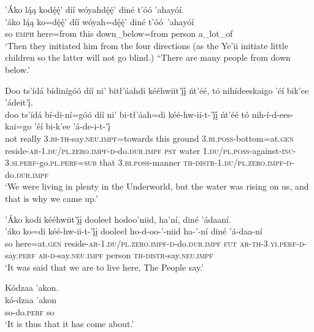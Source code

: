 \ea\label{ex:text4-4-14}
’Áko lą́ą kodę́ę́’ díí wóyahdę́ę́’ diné t’óó ’ahayóí.\\
\gll ’áko	lą́ą	ko=dę́ę́’	díí	wóyah=dę́ę́’	diné	t’óó~{’ahayóí}\\
     so	\textsc{emph}	here=from	this	down\_below=from	person	a\_lot\_of\\
\glt `Then they initiated him from the four directions (as the Ye'ii initiate little children so the latter will not go blind.) ``There are many people from down below.'
\z

\ea\label{ex:text4-4-15}
Doo ts’ídá bídinígóó díí ni’ bitł’áahdi kééhwiit’į́į́ ńt’éé, tó nihídeeskaigo ’éí bik’ee ’ádeit’į́.\\
\gll doo	ts’ídá	bí-di-ní=góó	díí	ni’	bi-tł’áah=di	kéé-hw-ii-t-’į́į́	ńt’éé	tó	nih-í-d-ees-kai=go	’éí	bi-k’ee	’á-de-i-t-’į́\\
     not	really	3.\textsc{bi}-\textsc{th}-say.\textsc{neu}.\textsc{impf}=towards	this	ground	3.\textsc{bi}.\textsc{poss}-bottom=at.\textsc{gen}	reside-\textsc{ar}-1.\textsc{du}/\textsc{pl}.\textsc{zero}.\textsc{impf}-\textsc{d}-do.\textsc{dur}.\textsc{impf}	\textsc{pst}	water	1.\textsc{du}/\textsc{pl}.\textsc{poss}-against-\textsc{inc}-3.\textsc{si}.\textsc{perf}-go.\textsc{pl}.\textsc{perf}=\textsc{sub}	that	3.\textsc{bi}.\textsc{poss}-manner	\textsc{th}-\textsc{distr}-1.\textsc{du}/\textsc{pl}.\textsc{zero}.\textsc{impf}-\textsc{d}-do.\textsc{dur}.\textsc{impf}\\
\glt `We were living in plenty in the Underworld, but the water was rising on us, and that is why we came up.'
\z

\newpage
\ea\label{ex:text4-4-16}
’Áko kodi kééhwiit’į́į dooleeł hodoo’niid, ha’ní, diné ’ádaaní.\\
\gll ’áko	ko=di	kéé-hw-ii-t-’į́į	dooleeł	ho-d-oo-’-niid	ha-’-ní	diné	’á-daa-ní\\
     so	here=at.\textsc{gen}	reside-\textsc{ar}-1.\textsc{du}/\textsc{pl}.\textsc{zero}.\textsc{impf}-\textsc{d}-do.\textsc{dur}.\textsc{impf}	\textsc{fut}	\textsc{ar}-\textsc{th}-3.\textsc{yi}.\textsc{perf}-\textsc{d}-say.\textsc{perf}	\textsc{ar}-\textsc{d}-say.\textsc{neu}.\textsc{impf}	person	\textsc{th}-\textsc{distr}-say.\textsc{neu}.\textsc{impf}\\
\glt `It was said that we are to live here, The People say.'
\z

\ea\label{ex:text4-4-17}
Kódzaa ’akon.\\
\gll kó-dzaa	’akon\\
     so-do.\textsc{perf}	so\\
\glt `It is thus that it has come about.'
\z

